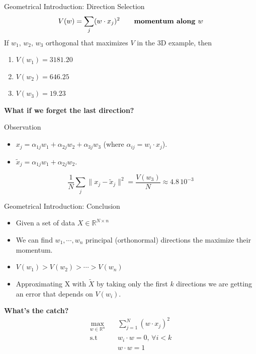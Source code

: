 \documentclass[10pt]{beamer}
\theoremstyle{definition}
\newcommand{\R}{\mathbb{R}}
\newcommand{\1}{\mathbbm{1}}
\begin{document}
\begin{frame}{Geometrical Introduction: Direction Selection}
  \[
    V(w)=\sum_j (w \cdot x_j)^2 \qquad\mbox{\bf momentum along $w$}
  \]
  If $w_1,\,w_2,\,w_3$ orthogonal that maximizes $V$ in the 3D example, then
  \begin{enumerate}
    \item $V(w_1) =  3181.20$\hfill{}
    \item $V(w_2) = 646.25$\hfill{}
    \item $V(w_3) = 19.23$ \hfill{}
  \end{enumerate}
    \begin{center}
      {\bf What if we forget the last direction?}
    \end{center}
  \begin{block}{Observation}
    \begin{itemize}
        \item $x_j =\alpha_{1j}w_1+\alpha_{2j}w_2+\alpha_{3j}w_3$
          (where $\alpha_{ij} = w_i\cdot x_j$).
        \item $\tilde x_j = \alpha_{1j}w_1 + \alpha_{2j}w_2$. 
    \end{itemize}
    \begin{equation}
      \frac{1}{N}\sum_j \|x_j - \tilde x_j\|^2 = \frac{V(w_3)}{N}\approx
      4.8\,10^{-3}
      \tag{MSE}
    \end{equation}
  \end{block}
\end{frame}
\begin{frame}{Geometrical Introduction: Conclusion}
  \begin{itemize}
    \item Given a set of data $X\in\R^{N\times n}$
    \item We can find $w_1,\cdots,w_n$ principal (orthonormal) directions the
      maximize their momentum.
    \item $V(w_1) > V(w_2)>\cdots> V(w_n)$
    \item Approximating X with $\tilde X$ by taking only the first $k$
      directions we are getting an error that depends on $V(w_i)$.
  \end{itemize}
  {\bf\centering What's the catch?}
   \begin{equation}
     \begin{aligned}
       \max_{w\in\R^n}\quad & \sum_{j=1}^N (w \cdot x_j)^2\\
       \mbox{s.t}\quad & w_i \cdot w =0, \,\forall i<k \\
       & w\cdot w = 1\\
    \end{aligned}
    \label{MP}
    \tag{MP}
  \end{equation} 
\end{frame}
\end{document}
